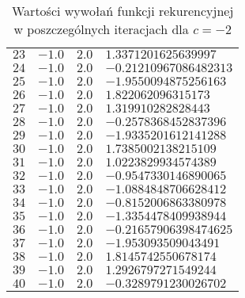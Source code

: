 \documentclass[12pt]{article}
\begin{document}
\begin{table}[h!]
\begin{tabularx}{0.55\textwidth}{l l l l}
            $23$ & $-1.0$ & $2.0$ & $1.3371201625639997$ \\
            $24$ & $-1.0$ & $2.0$ & $-0.21210967086482313$ \\
            $25$ & $-1.0$ & $2.0$ & $-1.9550094875256163$ \\
            $26$ & $-1.0$ & $2.0$ & $1.822062096315173$ \\
            $27$ & $-1.0$ & $2.0$ & $1.319910282828443$ \\
            $28$ & $-1.0$ & $2.0$ & $-0.2578368452837396$ \\
            $29$ & $-1.0$ & $2.0$ & $-1.9335201612141288$\\
            $30$ & $-1.0$ & $2.0$ & $1.7385002138215109$ \\
            $31$ & $-1.0$ & $2.0$ & $1.0223829934574389$ \\
            $32$ & $-1.0$ & $2.0$ & $-0.9547330146890065$ \\
            $33$ & $-1.0$ & $2.0$ & $-1.0884848706628412$ \\
            $34$ & $-1.0$ & $2.0$ & $-0.8152006863380978$ \\
            $35$ & $-1.0$ & $2.0$ & $-1.3354478409938944$ \\
            $36$ & $-1.0$ & $2.0$ & $-0.21657906398474625$ \\
            $37$ & $-1.0$ & $2.0$ & $-1.953093509043491$ \\
            $38$ & $-1.0$ & $2.0$ & $1.8145742550678174$ \\
            $39$ & $-1.0$ & $2.0$ & $1.2926797271549244$ \\
            $40$ & $-1.0$ & $2.0$ & $-0.3289791230026702$ \\
            \hline
        \end{tabularx}
        \label{table:ex6_c_2}
        \caption{Wartości wywołań funkcji rekurencyjnej w poszczególnych iteracjach dla $c = -2$}
    \end{table}
\end{document}
